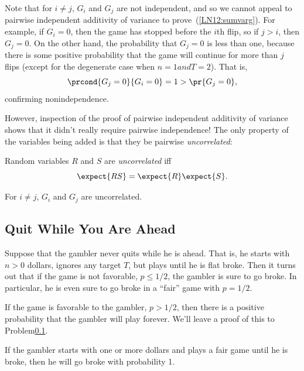 \begin{example}
Note that for $i \neq j$, $G_i$ and $G_j$ are not independent, and so we
cannot appeal to pairwise independent additivity of variance to
prove~(\ref{LN12:sumvarg}).  For example, if $G_i = 0$, then the game has
stopped before the $i$th flip, so if $j > i$, then $G_j = 0$.  On the
other hand, the probability that $G_j = 0$ is less than one, because there
is some positive probability that the game will continue for more than $j$
flips (except for the degenerate case when $n=1 and T=2$).  That is,
\[
\prcond{G_j = 0}{G_i = 0} = 1 > \pr{G_j = 0},
\]
confirming nonindependence.

However, inspection of the proof of pairwise independent additivity of
variance shows that it didn't really require pairwise independence!  The
only property of the variables being added is that they be pairwise
\emph{uncorrelated}:

\begin{definition*}
Random variables $R$ and $S$ are \emph{uncorrelated} iff
\begin{equation}\label{LN12:uncor}
\expect{RS} = \expect{R}\expect{S}.
\end{equation}
\end{definition*}

\begin{lemma}\label{LN12:Guncor}
For $i \neq j$, $G_i$ and $G_j$ are uncorrelated.
\end{lemma}
\fi

\iffalse
\subsection{Quit While You Are Ahead}

Suppose that the gambler never quits while he is ahead.  That is, he
starts with $n>0$ dollars, ignores any target $T$, but plays until he is
flat broke.  Then it turns out that if the game is not favorable, \ie $p
\leq 1/2$, the gambler is sure to go broke.  In particular, he is even
sure to go broke in a ``fair'' game with $p = 1/2$.

If the game is favorable to the gambler, \ie $p>1/2$, then there is a
positive probability that the gambler will play forever.  We'll leave a
proof of this to Problem\ref{}.

\begin{lemma}\label{LN12:go broke}
If the gambler starts with one or more dollars and plays a fair game until
he is broke, then he will go broke with probability 1.
\end{lemma}


\end{example}
